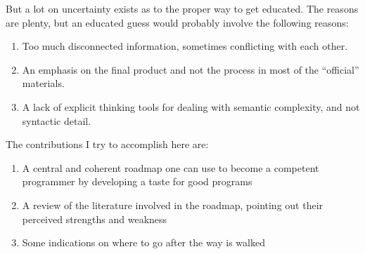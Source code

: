 But a lot on uncertainty exists as to the proper way to get educated. The
reasons are plenty, but an educated guess would probably involve the following
reasons:

\begin{enumerate}
    \item Too much disconnected information, sometimes conflicting with each
    other.

    \item An emphasis on the final product and not the process in most of the
    ``official'' materials. \cite{education:harvey__symbolic_programming_vs_AP_curriculum}

    \item A lack of explicit thinking tools for dealing with semantic
    complexity, and not syntactic detail. \cite{education:felleisen__sicsc}
\end{enumerate}


The contributions I try to accomplish here are:

\begin{enumerate}
    \item A central and coherent roadmap one can use to become a competent
    programmer by developing a taste for good programs

    \item A review of the literature involved in the roadmap, pointing out their
    perceived strengths and weakness

    \item Some indications on where to go after the way is walked
\end{enumerate}

